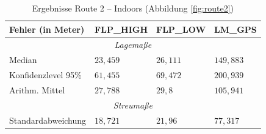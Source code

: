 \begin{table}[h!]
	\centering
	\caption{Ergebnisse Route 2 -- Indoors (Abbildung \ref{fig:route2})}
	\begin{tabular}{|l|l|l|l|}
	\hline
	Fehler (in Meter) & FLP\_HIGH & FLP\_LOW & LM\_GPS \\
	\hline
	\multicolumn{4}{|c|}{\textit{Lagemaße}}\\
	\hline
	Median & $23,459$ & $26,111$ & $149,883$ \\
	Konfidenzlevel 95\% & $61,455$ & $69,472$ & $200,939$ \\
	Arithm. Mittel & $27,788$ & $29,8$ & $105,941$ \\
	\hline
	\multicolumn{4}{|c|}{\textit{Streumaße}}\\
	\hline
	Standardabweichung & $18,721$ & $21,96$ & $77,317$ \\
	\hline
	\end{tabular}
\end{table}
	
